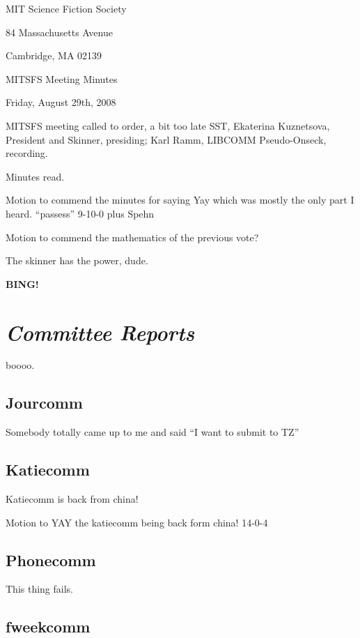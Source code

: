 \documentclass[10pt]{article}
\newcommand{\bing}{{\bf BING!} }
\newcommand{\goto}[1]{\bing \vskip 12pt \section*{{\em{#1}}}}
\newcommand{\ps}{ plus Spehn\xspace}
\begin{document}
\begin{center}

MIT Science Fiction Society

84 Massachusetts Avenue

Cambridge, MA 02139

\vspace{12pt}

MITSFS Meeting Minutes

Friday, August 29th, 2008

\end{center}

\vspace{18pt}

\setlength{\parskip}{6pt}

\noindent
MITSFS meeting called to order, a bit too late  SST,
Ekaterina Kuznetsova, President and Skinner, presiding; Karl Ramm, LIBCOMM Pseudo-Onseck, recording.

Minutes read.

Motion to commend the minutes for saying Yay which was mostly the only part
I heard. ``passess'' 9-10-0 \ps

Motion to commend the mathematics of the previous vote?

The skinner has the power, dude.

\BING

\goto{Committee Reports}

\BING

boooo.

\subsection*{Jourcomm}

Somebody totally came up to me and said ``I want to submit to TZ''

\subsection*{Katiecomm}

Katiecomm is back from china!

Motion to YAY the katiecomm being back form china!  14-0-4 \s

\subsection*{Phonecomm}

This thing fails.

\subsection*{fweekcomm}
\end{document}
